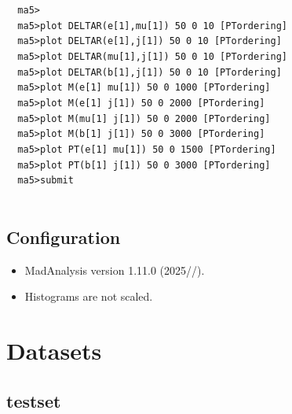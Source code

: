 \documentclass[a4paper, 10pt]{article}
\begin{document}
\texttt{ }\texttt{ }\texttt{ma5>\\
}
\texttt{ }\texttt{ }\texttt{ma5>plot DELTAR(e[1],mu[1])        50 0 10 [PTordering]\\
}
\texttt{ }\texttt{ }\texttt{ma5>plot DELTAR(e[1],j[1])         50 0 10 [PTordering]\\
}
\texttt{ }\texttt{ }\texttt{ma5>plot DELTAR(mu[1],j[1])        50 0 10 [PTordering]\\
}
\texttt{ }\texttt{ }\texttt{ma5>plot DELTAR(b[1],j[1])         50 0 10 [PTordering]\\
}
\texttt{ }\texttt{ }\texttt{ma5>plot M(e[1] mu[1])             50 0 1000 [PTordering]\\
}
\texttt{ }\texttt{ }\texttt{ma5>plot M(e[1] j[1])              50 0 2000 [PTordering]\\
}
\texttt{ }\texttt{ }\texttt{ma5>plot M(mu[1] j[1])             50 0 2000 [PTordering]\\
}
\texttt{ }\texttt{ }\texttt{ma5>plot M(b[1] j[1])              50 0 3000 [PTordering]\\
}
\texttt{ }\texttt{ }\texttt{ma5>plot PT(e[1] mu[1])            50 0 1500 [PTordering]\\
}
\texttt{ }\texttt{ }\texttt{ma5>plot PT(b[1] j[1])             50 0 3000 [PTordering]\\
}
\texttt{ }\texttt{ }\texttt{ma5>submit\\
}
\texttt{ }\texttt{ }\subsection{ Configuration}

\begin{itemize}
  \item MadAnalysis version 1.11.0 (2025//).
   \item Histograms are not scaled.
 
\end{itemize}
\newpage
\section{ Datasets}

\subsection{ testset}
\end{document}

